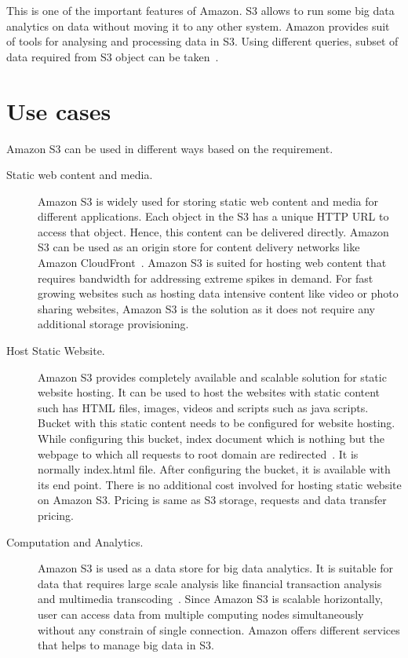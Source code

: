 This is one of the important features of Amazon. S3 allows to run some big 
data analytics on data without moving it to any other system. 
Amazon provides suit
of tools for analysing and processing data in S3. Using different queries, 
subset of data required from S3 object can be 
taken~\cite{hid-sp18-420-amazon-S3}.

\section{Use cases}
Amazon S3 can be used in different ways based on the requirement. 

\begin{description}
\item [Static web content and media.] Amazon S3 is widely used for storing 
static web content and media for different applications. Each object in the S3 
has a unique HTTP URL to access that object. Hence, this content can be 
delivered directly. Amazon S3 can be used as an origin store for content 
delivery networks like Amazon
CloudFront~\cite{hid-sp18-420-amazon-cloudfront}. 
Amazon S3 is suited for hosting web content that requires bandwidth for 
addressing extreme spikes in demand. For fast growing websites such as hosting 
data intensive content like video or photo sharing websites, Amazon S3 is the   
solution as it does not require any additional storage provisioning.



\item [Host Static Website.] Amazon S3 provides completely available and 
scalable solution for static website hosting. It can be used to host the 
websites with static content such has HTML files, images, videos and scripts 
such as java scripts.
Bucket with this static content needs to be configured for website hosting.
While configuring this bucket, index document which is nothing but the webpage 
to which all requests to root domain are 
redirected~\cite{hid-sp18-420-amazon-S3-details}. It is normally index.html 
file.
After configuring the bucket, it is available with its end point. There is no 
additional cost involved for hosting static website on Amazon S3. Pricing is 
same as S3 storage, requests and data transfer pricing.


\item [Computation and Analytics.] Amazon S3 is used as a data store for big 
data analytics. It is suitable for data that requires large scale analysis 
like financial transaction analysis and multimedia
transcoding~\cite{hid-sp18-420-amazon-S3-FAQ}.
Since Amazon S3 is scalable horizontally, user can access data from multiple 
computing nodes simultaneously without any constrain of single connection. 
Amazon offers different services that helps to manage big data in S3.



\end{description}
